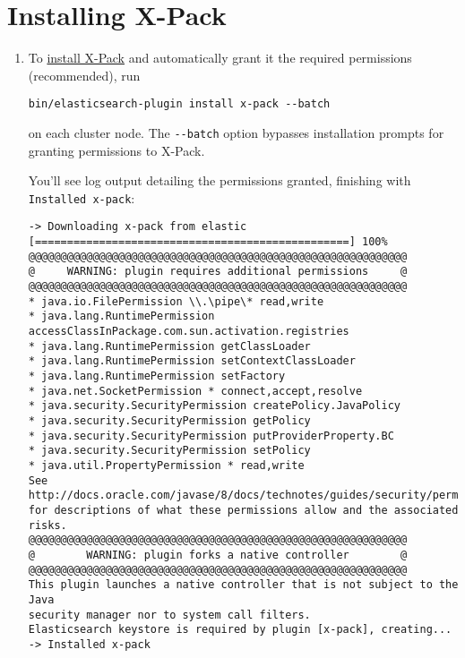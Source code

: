 \section{Installing X-Pack}\label{installing-x-pack}

\begin{enumerate}
\def\labelenumi{\arabic{enumi}.}
\item
  To
  \href{https://www.elastic.co/guide/en/elasticsearch/reference/6.1/installing-xpack-es.html}{install
  X-Pack} and automatically grant it the required permissions
  (recommended), run

\begin{verbatim}
bin/elasticsearch-plugin install x-pack --batch
\end{verbatim}

  on each cluster node. The \texttt{-\/-batch} option bypasses
  installation prompts for granting permissions to X-Pack.

  You'll see log output detailing the permissions granted, finishing
  with \texttt{Installed\ x-pack}:

\begin{verbatim}
-> Downloading x-pack from elastic
[=================================================] 100%   
@@@@@@@@@@@@@@@@@@@@@@@@@@@@@@@@@@@@@@@@@@@@@@@@@@@@@@@@@@@
@     WARNING: plugin requires additional permissions     @
@@@@@@@@@@@@@@@@@@@@@@@@@@@@@@@@@@@@@@@@@@@@@@@@@@@@@@@@@@@
* java.io.FilePermission \\.\pipe\* read,write
* java.lang.RuntimePermission accessClassInPackage.com.sun.activation.registries
* java.lang.RuntimePermission getClassLoader
* java.lang.RuntimePermission setContextClassLoader
* java.lang.RuntimePermission setFactory
* java.net.SocketPermission * connect,accept,resolve
* java.security.SecurityPermission createPolicy.JavaPolicy
* java.security.SecurityPermission getPolicy
* java.security.SecurityPermission putProviderProperty.BC
* java.security.SecurityPermission setPolicy
* java.util.PropertyPermission * read,write
See http://docs.oracle.com/javase/8/docs/technotes/guides/security/permissions.html
for descriptions of what these permissions allow and the associated risks.
@@@@@@@@@@@@@@@@@@@@@@@@@@@@@@@@@@@@@@@@@@@@@@@@@@@@@@@@@@@
@        WARNING: plugin forks a native controller        @
@@@@@@@@@@@@@@@@@@@@@@@@@@@@@@@@@@@@@@@@@@@@@@@@@@@@@@@@@@@
This plugin launches a native controller that is not subject to the Java
security manager nor to system call filters.
Elasticsearch keystore is required by plugin [x-pack], creating...
-> Installed x-pack
\end{verbatim}


\end{enumerate}
